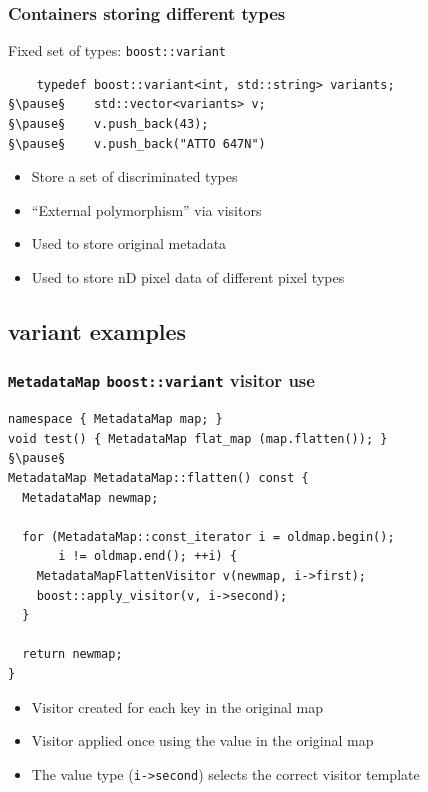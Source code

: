 \documentclass[handout]{beamer}
\begin{document}
\begin{frame}[fragile]
  \frametitle{Containers storing different types}
\begin{block}{Fixed set of types: \texttt{boost::variant}}
  \begin{lstlisting}
    typedef boost::variant<int, std::string> variants;
§\pause§    std::vector<variants> v;
§\pause§    v.push_back(43);
§\pause§    v.push_back("ATTO 647N")
\end{lstlisting}
  \begin{itemize}
    \pause
  \item Store a set of discriminated types
    \pause
  \item “External polymorphism” via visitors
    \pause
  \item Used to store original metadata
  \item Used to store nD pixel data of different pixel types
  \end{itemize}
\end{block}
\end{frame}

\subsection{variant examples}

\begin{frame}[fragile]
  \frametitle{\texttt{MetadataMap} \texttt{boost::variant} visitor use}
    \scriptsize
    \begin{lstlisting}
namespace { MetadataMap map; }
void test() { MetadataMap flat_map (map.flatten()); }
§\pause§
MetadataMap MetadataMap::flatten() const {
  MetadataMap newmap;

  for (MetadataMap::const_iterator i = oldmap.begin();
       i != oldmap.end(); ++i) {
    MetadataMapFlattenVisitor v(newmap, i->first);
    boost::apply_visitor(v, i->second);
  }

  return newmap;
}
\end{lstlisting}
  \begin{itemize}
    \pause
  \item Visitor created for each key in the original map
  \item Visitor applied once using the value in the original map
  \item The value type (\texttt{i->second}) selects the correct visitor template
  \end{itemize}
\end{frame}
\end{document}
